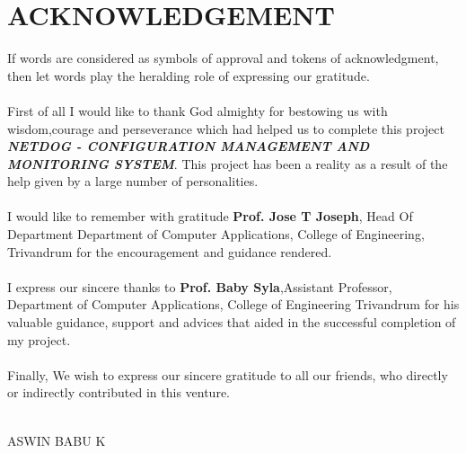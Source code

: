 \chapter*{\rm \large \bf ACKNOWLEDGEMENT}
\vspace{4.0mm}
\setlength{\parindent}{1cm} 


\indent If words are considered as symbols of approval and tokens of
acknowledgment, then let words play the heralding role of expressing our
gratitude.\\ \\

\indent First of all I would like to thank God almighty for bestowing us with
wisdom,courage and perseverance which had helped us to complete this
project \textbf{\textit{NETDOG - CONFIGURATION MANAGEMENT AND MONITORING SYSTEM}}.
This project has been a reality as a result of the help given by a large
number of personalities.\\ \\

\indent I would like to remember with gratitude \textbf{Prof. Jose T Joseph},
Head Of Department Department of Computer Applications, College of Engineering,
Trivandrum for the encouragement and guidance rendered.\\ \\

\indent I express our sincere thanks to \textbf{Prof. Baby Syla},Assistant
Professor, Department of Computer Applications, College of Engineering
Trivandrum for his valuable guidance, support and advices that aided in the
successful completion of my project.\\ \\

\indent Finally, We wish to express our sincere gratitude to all our friends,
who directly or indirectly contributed in this venture. \\ \\




\begin{flushright}
ASWIN BABU K\\
\end{flushright}
\newpage
